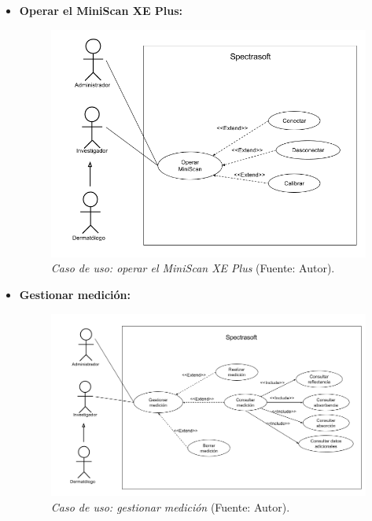  \begin{itemize}
 	
 	\item \textbf{Operar el MiniScan XE Plus:}
 	
 		\begin{figure}[H]
		\centering
		\includegraphics[scale=0.4]{img/cu-manejar-miniscan.png}
			\caption[Caso de uso: operar el MiniScan XE Plus]{\textit{Caso de uso: operar el MiniScan XE Plus} (Fuente: Autor).}
	\end{figure}
	
	 	\item \textbf{Gestionar medici\'{o}n:}
 	
 		\begin{figure}[H]
		\centering
		\includegraphics[scale=0.4]{img/cu-gestion-medicion.png}
			\caption[Caso de uso: gestionar medici\'{o}n]{\textit{Caso de uso: gestionar medici\'{o}n} (Fuente: Autor).}
	\end{figure}


\end{itemize}
